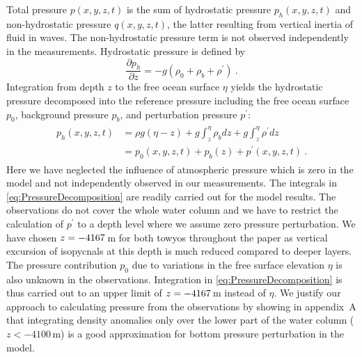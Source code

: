 \documentclass{ametsocV6.1}
\begin{document}
Total pressure $p(x,y,z,t)$ is the sum of hydrostatic pressure $p_h(x,y,z,t)$ and non-hydrostatic pressure $q(x,y,z,t)$, the latter resulting from vertical inertia of fluid in waves.
The non-hydrostatic pressure term is not observed independently in the measurements.
Hydrostatic pressure is defined by
\begin{equation}
    \frac{\partial p_h}{\partial z} = -g (\rho_0 + \rho_b + \rho^\prime)\ .
\label{eq:HydrostaticPressureDefinition}
\end{equation}
Integration from depth $z$ to the free ocean surface $\eta$ yields the hydrostatic pressure decomposed into the reference pressure including the free ocean surface $p_0$, background pressure $p_b$, and perturbation pressure $p^\prime$:
\begin{align}
\begin{split}
p_h(x,y,z,t) &= \rho g (\eta - z) + g \int_z^\eta \rho_b dz + g \int_z^\eta \rho^\prime dz \\
            &= p_0(x,y,z,t) + p_b(z) + p^\prime(x,y,z,t)\ .
\end{split}
\label{eq:PressureDecomposition}
\end{align}
Here we have neglected the influence of atmospheric pressure which is zero in the model and not independently observed in our measurements.
The integrals in \eqref{eq:PressureDecomposition} are readily carried out for the model results.
The observations do not cover the whole water column and we have to restrict the calculation of $p^\prime$ to a depth level where we assume zero pressure perturbation.
We have chosen $z=-4167$\,m for both towyos throughout the paper as vertical excursion of isopycnals at this depth is much reduced compared to deeper layers. 
The pressure contribution $p_0$ due to variations in the free surface elevation $\eta$ is also unknown in the observations.
Integration in \eqref{eq:PressureDecomposition} is thus carried out to an upper limit of $z=-4167$\,m instead of $\eta$.
We justify our approach to calculating pressure from the observations by showing in appendix~A that integrating density anomalies only over the lower part of the water column ($z<-4100$\,m) is a good approximation for bottom pressure perturbation in the model.
\end{document}
